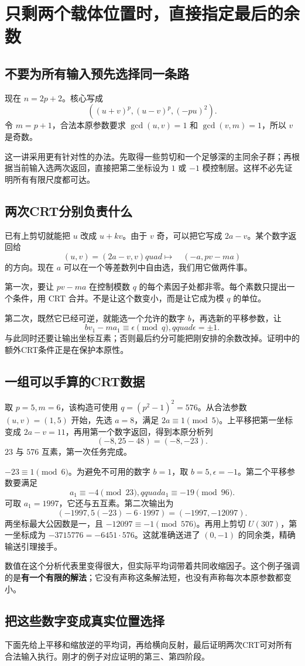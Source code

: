\chapter{只剩两个载体位置时，直接指定最后的余数}\label{ch:two}
\section{不要为所有输入预先选择同一条路}
现在 $n=2p+2$。核心写成
\[((u+v)^p,(u-v)^p,(-pu)^2).
\]
令 $m=p+1$，合法本原参数要求 $\gcd(u,v)=1$ 和 $\gcd(v,m)=1$，所以 $v$ 是奇数。

这一讲采用更有针对性的办法。先取得一些剪切和一个足够深的主同余子群；再根据当前输入选两次返回，直接把第二坐标设为 $1$ 或 $-1$ 模控制层。这样不必先证明所有有限尺度都可达。

\section{两次CRT分别负责什么}
已有上剪切就能把 $u$ 改成 $u+kv$。由于 $v$ 奇，可以把它写成 $2a-v$。某个数字返回给
\[(u,v)=(2a-v,v)quad\longmapsto\quad(-a,pv-ma)
\]
的方向。现在 $a$ 可以在一个等差数列中自由选，我们用它做两件事。

第一次，要让 $pv-ma$ 在控制模数 $q$ 的每个素因子处都非零。每个素数只提出一个条件，用 CRT 合并。不是让这个数变小，而是让它成为模 $q$ 的单位。

第二次，既然它已经可逆，就能选一个允许的数字 $b$，再选新的平移参数，让
\[bv_1-ma_1\equiv\epsilon\pmod q,qquad\epsilon=\pm1.
\]
与此同时还要让输出坐标互素；否则最后约分可能把刚安排的余数改掉。证明中的额外CRT条件正是在保护本原性。

\section{一组可以手算的CRT数据}
取 $p=5,m=6$，该构造可使用 $q=(p^2-1)^2=576$。从合法参数 $(u,v)=(1,5)$ 开始，先选 $a=8$，满足 $2a\equiv1\pmod5$。上平移把第一坐标变成 $2a-v=11$，再用第一个数字返回，得到本原分析列
\[(-8,25-48)=(-8,-23).
\]
$23$ 与 $576$ 互素，第一次任务完成。

$-23\equiv1\pmod6$。为避免不可用的数字 $b=1$，取 $b=5,\epsilon=-1$。第二个平移参数要满足
\[a_1\equiv-4\pmod{23},qquad a_1\equiv-19\pmod{96}.
\]
可取 $a_1=1997$，它还与五互素。第二次输出为
\[(-1997,5(-23)-6\cdot1997)=(-1997,-12097).
\]
两坐标最大公因数是一，且 $-12097\equiv-1\pmod{576}$。再用上剪切 $U(307)$，第一坐标成为 $-3715776=-6451\cdot576$。这就准确送进了 $(0,-1)$ 的同余类，精确输送引理接手。

数值在这个分析代表里变得很大，但实际平均词带着共同收缩因子。这个例子强调的是\textbf{有一个有限的解法}；它没有声称这条解法短，也没有声称每次本原参数都变小。

\section{把这些数字变成真实位置选择}
下面先给上平移和缩放逆的平均词，再给横向反射，最后证明两次CRT可对所有合法输入执行。刚才的例子对应证明的第三、第四阶段。
